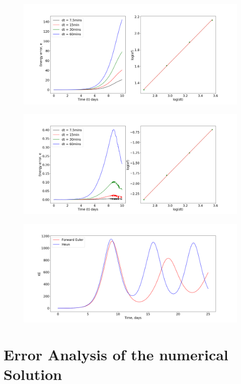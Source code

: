 \begin{figure}
	\centering
	\includegraphics[width=\linewidth]{evaluation/energy_10D_euler}
	\caption{}
	\label{fig:euler5denergy}
\end{figure}
\begin{figure}
	\centering
	\includegraphics[width=\linewidth]{evaluation/energy_10D_heun}
	\caption{}
	\label{fig:euler5denergy}
\end{figure}
\begin{figure}
	\centering
	\includegraphics[width=\linewidth]{evaluation/energy_euler_heun_comparison}
	\caption{}
	\label{fig:euler5denergy}
\end{figure}

\section{Error Analysis of the numerical Solution}
